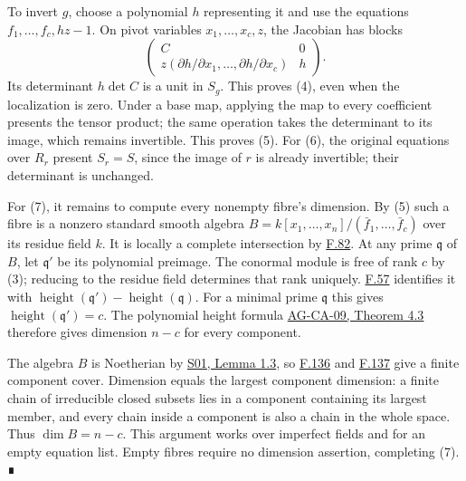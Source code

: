 \documentclass[11pt,a4paper,openany]{report}
\newcounter{none}
\begin{document}
To invert \(g\), choose a polynomial \(h\) representing it and use the equations \(f_1,\ldots,f_c,hz-1\). On pivot variables \(x_1,\ldots,x_c,z\), the Jacobian has blocks \[
\begin{pmatrix}C&0\\z(\partial h/\partial x_1,\ldots,\partial h/\partial x_c)&h\end{pmatrix}.
\] Its determinant \(h\det C\) is a unit in \(S_g\). This proves (4), even when the localization is zero. Under a base map, applying the map to every coefficient presents the tensor product; the same operation takes the determinant to its image, which remains invertible. This proves (5). For (6), the original equations over \(R_r\) present \(S_r=S\), since the image of \(r\) is already invertible; their determinant is unchanged.

For (7), it remains to compute every nonempty fibre's dimension. By (5) such a fibre is a nonzero standard smooth algebra \(B=k[x_1,\ldots,x_n]/(\bar f_1,\ldots,\bar f_c)\) over its residue field \(k\). It is locally a complete intersection by \hyperref[AG-RG-S05-algebra-lemma-smooth-over-field]{F.82}. At any prime \(\mathfrak q\) of \(B\), let \(\mathfrak q'\) be its polynomial preimage. The conormal module is free of rank \(c\) by (3); reducing to the residue field determines that rank uniquely. \hyperref[AG-RG-S05-algebra-lemma-lci]{F.57} identifies it with \(\operatorname{height}(\mathfrak q')-\operatorname{height}(\mathfrak q)\). For a minimal prime \(\mathfrak q\) this gives \(\operatorname{height}(\mathfrak q')=c\). The polynomial height formula \href{https://github.com/KokunoYumeto/open-math-courses/blob/d02d0a3669f42579db037cd44de1d113fdd770a1/docs/courses/AG-CA/src/krull-dimension-and-noether-normalization.md}{AG-CA-09, Theorem 4.3} therefore gives dimension \(n-c\) for every component.

The algebra \(B\) is Noetherian by \href{https://github.com/KokunoYumeto/open-math-courses/blob/main/docs/courses/AG-RG/AG-RG-S01.md}{S01, Lemma 1.3}, so \hyperref[AG-RG-S05-topology-lemma-Noetherian]{F.136} and \hyperref[AG-RG-S05-topology-lemma-irreducible]{F.137} give a finite component cover. Dimension equals the largest component dimension: a finite chain of irreducible closed subsets lies in a component containing its largest member, and every chain inside a component is also a chain in the whole space. Thus \(\dim B=n-c\). This argument works over imperfect fields and for an empty equation list. Empty fibres require no dimension assertion, completing (7). ∎
\end{document}
